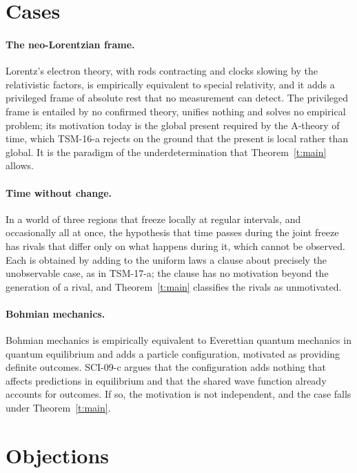 \documentclass{situationist-preprint}
\begin{document}
\section{Cases}

\paragraph{The neo-Lorentzian frame.} Lorentz's electron theory, with rods contracting and clocks slowing by the relativistic factors, is empirically equivalent to special relativity, and it adds a privileged frame of absolute rest that no measurement can detect. The privileged frame is entailed by no confirmed theory, unifies nothing and solves no empirical problem; its motivation today is the global present required by the A-theory of time, which TSM-16-a rejects on the ground that the present is local rather than global. It is the paradigm of the underdetermination that Theorem~\ref{t:main} allows.

\paragraph{Time without change.} In a world of three regions that freeze locally at regular intervals, and occasionally all at once, the hypothesis that time passes during the joint freeze has rivals that differ only on what happens during it, which cannot be observed. Each is obtained by adding to the uniform laws a clause about precisely the unobservable case, as in TSM-17-a; the clause has no motivation beyond the generation of a rival, and Theorem~\ref{t:main} classifies the rivals as unmotivated.

\paragraph{Bohmian mechanics.} Bohmian mechanics is empirically equivalent to Everettian quantum mechanics in quantum equilibrium and adds a particle configuration, motivated as providing definite outcomes. SCI-09-c argues that the configuration adds nothing that affects predictions in equilibrium and that the shared wave function already accounts for outcomes. If so, the motivation is not independent, and the case falls under Theorem~\ref{t:main}.

\section{Objections}
\end{document}
